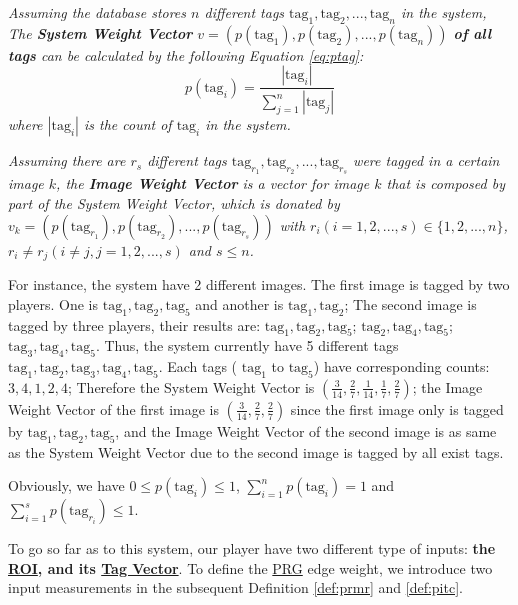 \begin{definition}
\label{def:weightv}
\emph{
Assuming the database stores $n$ different tags $\text{tag}_1, \text{tag}_2, ..., \text{tag}_n$ in the system,
The \textbf{System Weight Vector} $v = (p(\text{tag}_1), p(\text{tag}_2), ..., p(\text{tag}_n))$ 
\textbf{of all tags} can be calculated by the following Equation \ref{eq:ptag}:
\begin{equation}
\label{eq:ptag}
p(\text{tag}_i) = \frac{|\text{tag}_i|}{\sum_{j=1}^{n}{|\text{tag}_j|}}
\end{equation}
where  $|\text{tag}_i|$ is the count of $\text{tag}_i$ in the system.
}
\end{definition}
\begin{definition}
\label{def:weightvk}
\emph{
Assuming there are $r_s$ different tags $\text{tag}_{r_1}, \text{tag}_{r_2}, ..., \text{tag}_{r_s}$ were tagged in
a certain image $k$, the \textbf{Image Weight Vector} is a vector for image $k$ that is
composed by part of the System Weight Vector, which 
is donated by $v_k = (p(\text{tag}_{r_1}), p(\text{tag}_{r_2}), ..., p(\text{tag}_{r_s}))$
with $r_i (i=1,2,...,s) \in \{1, 2, ..., n\}$, $r_i \neq r_j (i\neq j, j=1,2,...,s)$ and $s \leq n$.
}
\end{definition}

For instance, the system have 2 different images. The first image is tagged by two players. One is 
$\text{tag}_1, \text{tag}_2, \text{tag}_5$ and another is $\text{tag}_1, \text{tag}_2$;
The second image is tagged by three players, their results are:
$\text{tag}_1, \text{tag}_2, \text{tag}_5$;
$\text{tag}_2, \text{tag}_4, \text{tag}_5$; 
$\text{tag}_3, \text{tag}_4, \text{tag}_5$. 
Thus, the system currently have 5 different tags $\text{tag}_1, \text{tag}_2, \text{tag}_3, \text{tag}_4, \text{tag}_5$.
Each tags ( $\text{tag}_1$ to $\text{tag}_5$) have corresponding counts: $3, 4, 1, 2, 4$; Therefore the
System Weight Vector is $(\frac{3}{14}, \frac{2}{7}, \frac{1}{14}, \frac{1}{7}, \frac{2}{7})$;
the Image Weight Vector of the first image is $(\frac{3}{14}, \frac{2}{7}, \frac{2}{7})$
since the first image only is tagged by $\text{tag}_1, \text{tag}_2, \text{tag}_5$, and
the Image Weight Vector of the second image is as same as the System Weight Vector
due to the second image is tagged by all exist tags.

Obviously, we have $0 \leq p(\text{tag}_i)\leq 1$, $\sum_{i=1}^{n}{p(\text{tag}_{i})}=1$ and $\sum_{i=1}^{s}{p(\text{tag}_{r_i})} \leq 1$.

To go so far as to this system, our player have two different type of inputs: \textbf{the \hyperref[def:roi]{ROI}, 
and its \hyperref[def:tagv]{Tag Vector}}. To define the \hyperref[idx:prg]{PRG} edge weight, 
we introduce two input measurements in the subsequent Definition \ref{def:prmr} and \ref{def:pitc}.


